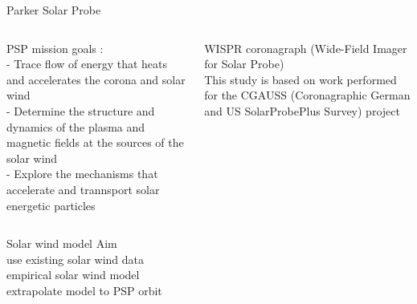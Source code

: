 \begin{frame}[c]{Parker Solar Probe}{}
	\begin{columns}[c]
		
		PSP mission goals \citep{Fox2015}:\\
		- Trace flow of energy that heats and accelerates the corona and solar wind\\
		- Determine the structure and dynamics of the plasma and magnetic fields at the sources of the solar wind\\
		- Explore the mechanisms that accelerate and trannsport solar energetic particles\\

	\column<2>{0.5\textwidth}
	
		WISPR coronagraph (Wide-Field Imager for Solar Probe)\\
		This study is based on work performed for the CGAUSS (Coronagraphic German and US SolarProbePlus Survey) project

	\end{columns}
\end{frame}

\begin{frame}[c]{Solar wind model}{}
	Aim\\
	use existing solar wind data\\
	empirical solar wind model\\
	extrapolate model to PSP orbit
\end{frame}


